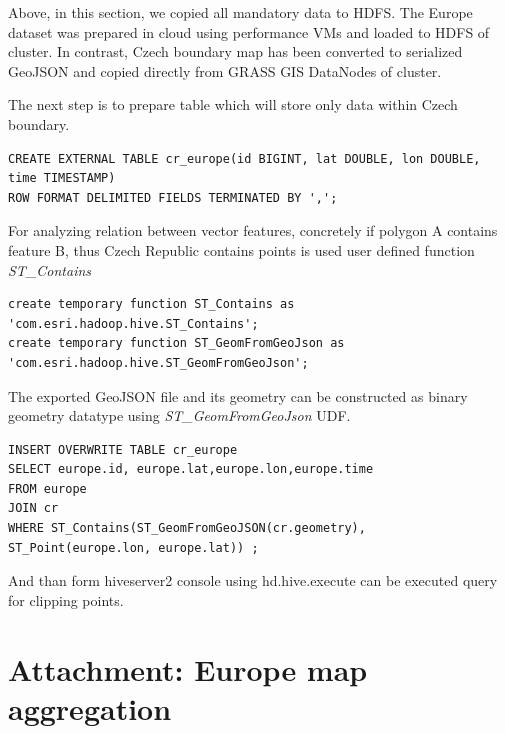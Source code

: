 \documentclass[a4paper,12pt,oneside]{report}
\begin{document}
		Above, in this section, we copied all mandatory data to HDFS. The Europe
		dataset was prepared in cloud using performance VMs
		and loaded to HDFS of cluster. In contrast, Czech boundary map has been
		converted to serialized GeoJSON and copied directly from GRASS GIS DataNodes of
		cluster.
		
		The next step is to prepare table which will store only data within Czech boundary.
	\begin{footnotesize}
		\begin{lstlisting}[style=python]
CREATE EXTERNAL TABLE cr_europe(id BIGINT, lat DOUBLE, lon DOUBLE, time TIMESTAMP)
ROW FORMAT DELIMITED FIELDS TERMINATED BY ',';
		\end{lstlisting}
	\end{footnotesize}
For  analyzing relation between vector features, concretely if polygon A contains feature B, thus Czech Republic contains points is used user defined function \textit{ST\_Contains}
	\begin{footnotesize}
		\begin{lstlisting}[style=python]
create temporary function ST_Contains as 'com.esri.hadoop.hive.ST_Contains';
create temporary function ST_GeomFromGeoJson as 'com.esri.hadoop.hive.ST_GeomFromGeoJson';
		\end{lstlisting}
	\end{footnotesize}
The exported GeoJSON file and its geometry can be constructed as binary geometry
 datatype using \textit{ST\_GeomFromGeoJson} UDF.
	\begin{footnotesize}
		\begin{lstlisting}[style=python]
INSERT OVERWRITE TABLE cr_europe
SELECT europe.id, europe.lat,europe.lon,europe.time
FROM europe 
JOIN cr 
WHERE ST_Contains(ST_GeomFromGeoJSON(cr.geometry), ST_Point(europe.lon, europe.lat)) ;
		\end{lstlisting}
	\end{footnotesize}
And than form hiveserver2 console using hd.hive.execute can be executed query for clipping points.


\newpage
	\section{Attachment: Europe map aggregation}\label{open_street_agg_all}
	
\end{document}
